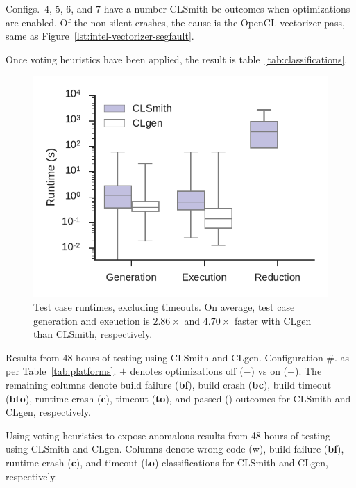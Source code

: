 Configs.\ $4$, $5$, $6$, and $7$ have a number CLSmith bc outcomes when optimizations are enabled. Of the non-silent crashes, the cause is the OpenCL vectorizer pass, same as Figure~\ref{lst:intel-vectorizer-segfault}.


Once voting heuristics have been applied, the result is table~\ref{tab:classifications}.

\begin{figure}
	\centering %
	\includegraphics[width=\columnwidth]{build/img/runtimes}%
	\caption{%
		Test case runtimes, excluding timeouts. On average, test case generation and exeuction is $2.86\times$ and $4.70\times$ faster with CLgen than CLSmith, respectively. %
	}%
	\label{fig:runtimes} %
\end{figure}


\begin{table}
	\scriptsize %
	\centering %
	
	\caption{Results from 48 hours of testing using CLSmith and CLgen. Configuration \#. as per Table~\ref{tab:platforms}. $\pm$ denotes optimizations off ($-$) vs on ($+$). The remaining columns denote build failure (\textbf{bf}), build crash (\textbf{bc}), build timeout (\textbf{bto}), runtime crash (\textbf{c}), timeout (\textbf{to}), and passed (\textbf{\cmark}) outcomes for CLSmith and CLgen, respectively.}
	\label{tab:outcomes}
\end{table}

\begin{table}
	\scriptsize %
	\centering %
	
	\caption{Using voting heuristics to expose anomalous results from 48 hours of testing using CLSmith and CLgen. Columns denote wrong-code (w), build failure (\textbf{bf}), runtime crash (\textbf{c}), and timeout (\textbf{to}) classifications for CLSmith and CLgen, respectively.}
	\label{tab:classifications}
\end{table}


